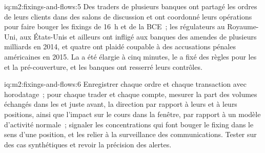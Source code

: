 \begin{solution}{iq:m2:fixings-and-flows:5}
Des traders de plusieurs banques ont partagé les ordres de leurs clients dans des salons de discussion et ont coordonné
leurs opérations pour faire bouger les fixings de 16~h et de la BCE~; les régulateurs au Royaume-Uni, aux États-Unis et ailleurs
ont infligé aux banques des amendes de plusieurs milliards en 2014, et quatre ont plaidé
coupable à des accusations pénales américaines en 2015. La  a été élargie à cinq minutes, le  a fixé
des règles pour les  et la pré-couverture, et les banques ont resserré leurs contrôles.
\end{solution}

\begin{solution}{iq:m2:fixings-and-flows:6}
Enregistrer chaque ordre et chaque transaction avec horodatage~; pour chaque trader et chaque compte,
mesurer la part des volumes échangés dans les  et juste avant, la direction
par rapport à leurs  et à leurs positions, ainsi que l'impact sur le cours dans la
fenêtre, par rapport à un modèle d'activité normale~; signaler les concentrations qui font bouger le fixing
dans le sens d'une position, et les relier à la surveillance des communications.
Tester sur des cas synthétiques et revoir la précision des alertes.
\end{solution}
